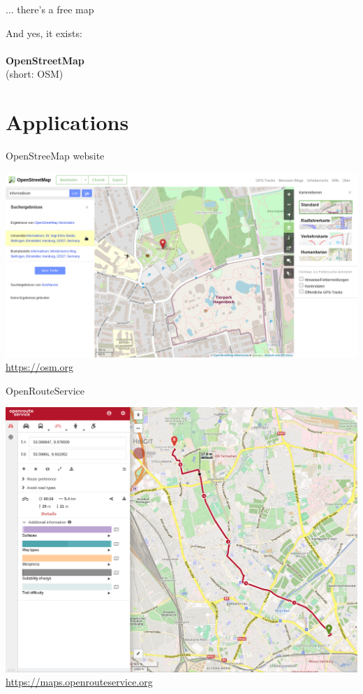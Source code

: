 \documentclass{beamer}
\begin{document}
	\begin{frame}{... there's a free map}
		\begin{center}
			And yes, it exists:\\
			\hfill\\
			\textbf{OpenStreetMap}\\
			{\tiny (short: OSM)}
		\end{center}
	\end{frame}
	
	\section{Applications}
	
	\begin{frame}{OpenStreeMap website}
		\begin{center}
			\includegraphics[height=0.7\textheight]{images/osm-website}\\
			\url{https://osm.org}
		\end{center}
	\end{frame}
	
	\begin{frame}{OpenRouteService}
		\begin{center}
			\includegraphics[height=0.7\textheight]{images/openrouteservice}\\
			\url{https://maps.openrouteservice.org}
		\end{center}
	\end{frame}
	
\end{document}
